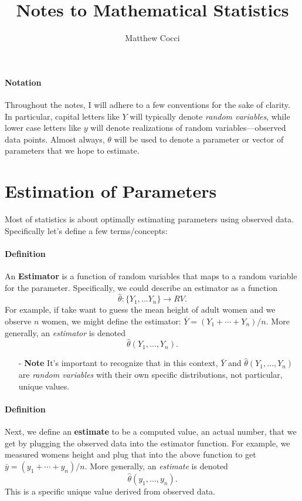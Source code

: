 \documentclass[a4paper,12pt]{scrartcl}
\author{Matthew Cocci}
\title{Notes to Mathematical Statistics}
\date{}
\begin{document}
\maketitle

\tableofcontents
\newpage

\paragraph{Notation} Throughout the notes, I will adhere to a few 
conventions for the sake of clarity.  In particular, capital letters
like $Y$ will typically denote \emph{random variables}, while 
lower case letters like $y$ will denote realizations of random
variables---observed data points.  Almost always, $\theta$ will be
used to denote a parameter or vector of parameters that we hope to 
estimate.


\section{Estimation of Parameters}

Most of statistics is about optimally estimating parameters using 
observed data. Specifically let's define a few terms/concepts:
\paragraph{Definition}
      An \textbf{Estimator} is a function of random variables
      that maps to a random variable for the parameter.  
      Specifically, we could describe
      an estimator as a function
	 \[ \hat{\theta}: \{Y_1, \ldots Y_n\} \rightarrow RV.\]
      For example, if take want to guess the mean height of adult women
      and we observe $n$ women, we might define the estimator:
	 $\bar{Y} =  (Y_1 + \cdots + Y_n)/n$.
      More generally, an \emph{estimator} is denoted
	 \[ \hat{\theta}(Y_1, \ldots , Y_n).\]
      \begin{itemize}
      \item[-]{
      \textbf{Note} It's important to recognize that in this context,
      $\bar{Y}$ and $\hat{\theta}(Y_1, \ldots , Y_n)$ are 
      \emph{random variables} with their own specific distributions, 
      not particular, unique values.
      }
      \end{itemize}
      
\paragraph{Definition}
      Next, we define an \textbf{estimate} to be a computed value,
      an actual number, that we get by plugging the observed data into
      the estimator function.  For example, we measured womens height
      and plug that into the above function to get
	 $\bar{y} =  (y_1 + \cdots + y_n)/n$.
      More generally, an \emph{estimate} is denoted
	 \[ \hat{\theta}(y_1, \ldots , y_n).\]
      This is a specific unique value derived from observed data.
\end{document}
